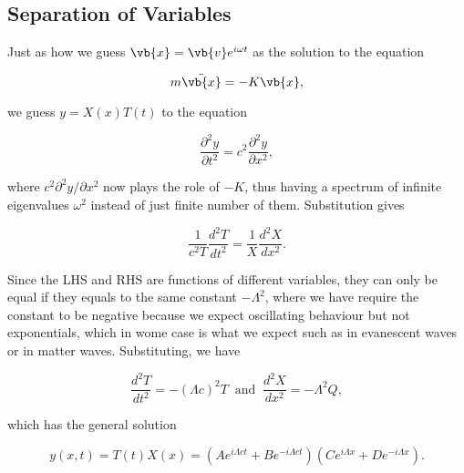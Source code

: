 \documentclass[a4paper,12pt]{report}
\begin{document}
\subsection{Separation of Variables} \label{sepvar} 

Just as how we guess \(\vb{x} = \vb{v} e^{i \omega t} \) as the solution to the equation

\begin{equation}
	m\ddot{\vb{x} } = -K\vb{x} ,  
\end{equation}

we guess \(y = X(x)T(t)\) to the equation 

\begin{equation}
	\frac{\partial^2 y}{\partial t^2} = c^2 \frac{\partial^2 y}{\partial x^2}, 
\end{equation}

where \(c^2 \partial ^2 y/\partial x^2 \) now plays the role of \(-K\), thus having a spectrum of infinite eigenvalues \(\omega ^2\) instead of just finite number of them. Substitution gives

\begin{equation}
	\frac{1}{c^2 T} \frac{d^2T}{dt^2} = \frac{1}{X}\frac{d^2X}{dx^2}.
\end{equation}

Since the LHS and RHS are functions of different variables, they can only be equal if they equals to the same constant \(-\Lambda^2 \), where we have require the constant to be negative because we expect oscillating behaviour but not exponentials, which in wome case is what we expect such as in evanescent waves or in matter waves. Substituting, we have

\begin{equation}
	\frac{d^2T }{dt^2} = -(\Lambda c)^2T ~\text { and }~ \frac{d^2X}{dx^2} = -\Lambda ^2Q,
\end{equation}

which has the general solution

\begin{equation}
	y(x,t) = T(t)X(x) = \left( Ae^{i\Lambda ct}+Be^{-i\Lambda ct}    \right)\left( Ce^{i \Lambda x}+De^{-i \Lambda x}   \right). \label{ThetaQ}   
\end{equation}
\end{document}
